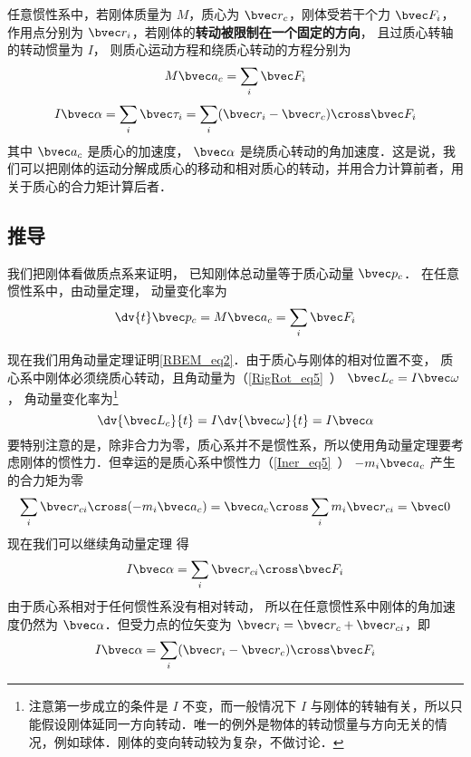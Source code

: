 

任意惯性系中，若刚体质量为 $M$，质心为 $\bvec r_c$，刚体受若干个力 $\bvec F_i$，作用点分别为 $\bvec r_i$，若刚体的\textbf{转动被限制在一个固定的方向}， 且过质心转轴的转动惯量为 $I$， 则质心运动方程和绕质心转动的方程分别为
\begin{equation}\label{RBEM_eq1}
M\bvec a_c = \sum_i \bvec F_i
\end{equation}
\begin{equation}\label{RBEM_eq2}
I \bvec \alpha = \sum_i \bvec \tau_i = \sum_i (\bvec r_i-\bvec r_c) \cross  \bvec F_i
\end{equation}
其中 $\bvec a_c$ 是质心的加速度， $\bvec \alpha$ 是绕质心转动的角加速度．这是说，我们可以把刚体的运动分解成质心的移动和相对质心的转动，并用合力计算前者，用关于质心的合力矩计算后者．

\subsection{推导}
我们把刚体看做质点系来证明， 已知刚体总动量等于质心动量 $\bvec p_c$． 在任意惯性系中，由动量定理， 动量变化率为
\begin{equation}
\dv{t} \bvec p_c = M \bvec a_c = \sum_i \bvec F_i
\end{equation}

现在我们用角动量定理证明\autoref{RBEM_eq2}．由于质心与刚体的相对位置不变，%
质心系中刚体必须绕质心转动，且角动量为（\autoref{RigRot_eq5}~） $\bvec L_c = I \bvec\omega$， 角动量变化率为\footnote{注意第一步成立的条件是 $I$ 不变，而一般情况下 $I$ 与刚体的转轴有关，所以只能假设刚体延同一方向转动．唯一的例外是物体的转动惯量与方向无关的情况，例如球体．刚体的变向转动较为复杂，不做讨论．}
\begin{equation}
\dv{\bvec L_c}{t} = I \dv{\bvec \omega}{t} = I \bvec\alpha
\end{equation}
要特别注意的是，除非合力为零，质心系并不是惯性系，所以使用角动量定理要考虑刚体的惯性力．但幸运的是质心系中惯性力（\autoref{Iner_eq5}~） $-m_i \bvec a_c$ 产生的合力矩为零
\begin{equation}
\sum_i \bvec r_{ci}\cross (-m_i \bvec a_{c}) = \bvec a_{c} \cross \sum_i m_i \bvec r_{ci} = \bvec 0
\end{equation}
现在我们可以继续角动量定理 得
\begin{equation}
I \bvec\alpha = \sum_i \bvec r_{ci} \cross  \bvec F_i
\end{equation}
由于质心系相对于任何惯性系没有相对转动， 所以在任意惯性系中刚体的角加速度仍然为 $\bvec\alpha$．但受力点的位矢变为 $\bvec r_i = \bvec r_c + \bvec r_{ci}$，即
\begin{equation}\label{RBEM_eq7}
I \bvec \alpha = \sum_i (\bvec r_i-\bvec r_c) \cross  \bvec F_i
\end{equation}

